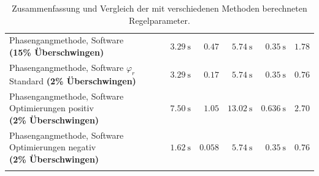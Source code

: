 \begin{longtable}{p{50mm}rrrrr}
    \addlinespace[1em]

    \pbox{70mm}{Phasengangmethode, \small{Software} \\ \small{\textbf{(15\% \"Uberschwingen)}} \\}
    &
    $\SI{3.29}{\second}$
    &
    $0.47$
    &
    $\SI{5.74}{\second}$
    &
    $\SI{0.35}{\second}$
    &
    $1.78$
    \\

    \addlinespace[1em]

    \pbox{70mm}{Phasengangmethode, \small{Software} \\ $\varphi_r$ Standard \\ \small{\textbf{(2\% \"Uberschwingen)}} \\}
    &
    $\SI{3.29}{\second}$
    &
    $0.17$
    &
    $\SI{5.74}{\second}$
    &
    $\SI{0.35}{\second}$
    &
    $0.76$
    \\

    \addlinespace[1em]

    \pbox{70mm}{Phasengangmethode, \small{Software} \\ Optimierungen positiv \\ \small{\textbf{(2\% \"Uberschwingen)}} \\}
    &
    $\SI{7.50}{\second}$
    &
    $1.05$
    &
    $\SI{13.02}{\second}$
    &
    $\SI{0.636}{\second}$
    &
    $2.70$
    \\

    \addlinespace[1em]

    \pbox{70mm}{Phasengangmethode, \small{Software} \\ Optimierungen negativ \\ \small{\textbf{(2\% \"Uberschwingen)}} \\}
    &
    $\SI{1.62}{\second}$
    &
    $0.058$
    &
    $\SI{5.74}{\second}$
    &
    $\SI{0.35}{\second}$
    &
    $0.76$
    \\

    \addlinespace[1em]


    \bottomrule
    \caption{%
        Zusammenfassung   und  Vergleich   der   mit  verschiedenen   Methoden
        berechneten Regelparameter.
    }
\label{tab:allresults}
\end{longtable}


